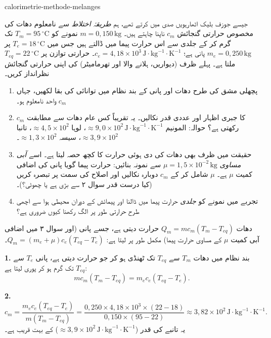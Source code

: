 \begin{exo}{calorimetrie-methode-melanges}

جیسے جوزف بلیک اٹھارہویں صدی میں کرتے تھے، ہم \emph{طریقۂ اختلاط} سے نامعلوم دھات کی مخصوص حرارتی گنجائش $c_m$ ناپنا چاہتے ہیں۔ $m=0{,}150\,\text{kg}$ نمونے کو $T_m=95\,{}^\circ\text{C}$ تک گرم کر کے جلدی سے اس حرارت پیما میں ڈالتے ہیں جس میں $T_e=18\,{}^\circ\text{C}$ پر $m_e=0{,}250\,\text{kg}$ پانی ہے؛ $c_e=4{,}18\times10^3\,\text{J}\!\cdot\!\text{kg}^{-1}\!\cdot\!\text{K}^{-1}$۔ حرارتی توازن پر $T_{eq}=22\,{}^\circ\text{C}$ ملتا ہے۔ پہلے ظرف (دیواریں، ہلانے والا اور تھرمامیٹر) کی اپنی حرارتی گنجائش نظرانداز کریں۔

\begin{enumerate}
  \item پچھلی مشق کی طرح دھات اور پانی کے بند نظام میں توانائی کی بقا لکھیں، جہاں $c_m$ واحد نامعلوم ہو۔
  \item $c_m$ کا جبری اظہار اور عددی قدر نکالیں۔ یہ تقریباً کس عام دھات سے مطابقت رکھتی ہے؟ حوالہ: المونیم $\approx9{,}0\times10^2\,\text{J}\!\cdot\!\text{kg}^{-1}\!\cdot\!\text{K}^{-1}$، لوہا $\approx4{,}5\times10^2$، تانبا $\approx3{,}9\times10^2$، سیسہ $\approx1{,}3\times10^2$۔
  \item حقیقت میں ظرف بھی دھات کی دی ہوئی حرارت کا کچھ حصہ لیتا ہے۔ اسے \emph{آبی مساوی} $\mu=1{,}5\times10^{-2}\,\text{kg}$ سے نمونہ بنائیں: حرارت پیما گویا پانی کی اضافی کمیت $\mu$ ہے۔ $\mu$ شامل کر کے $c_m$ دوبارہ نکالیں اور اصلاح کی سمت پر تبصرہ کریں (کیا درست قدر سوال ۲ سے بڑی ہے یا چھوٹی؟)۔
  \item تجربے میں نمونے کو \emph{جلدی} حرارت پیما میں ڈالنا اور پیمائش کے دوران محیطی ہوا سے اچھی طرح حرارتی طور پر الگ رکھنا کیوں ضروری ہے؟
\end{enumerate}

\begin{indication}
دھات $Q_m=mc_m(T_m-T_{eq})$ حرارت دیتی ہے، جسے پانی (اور سوال ۳ میں اضافی آبی کمیت $\mu$ کے مساوی حرارت پیما) مکمل طور پر لیتا ہے: $Q_m=(m_e+\mu)c_e(T_{eq}-T_e)$۔
\end{indication}

\begin{solution}
\textbf{1.} بند نظام میں دھات $T_m$ سے $T_{eq}$ تک ٹھنڈی ہو کر جو حرارت دیتی ہے، پانی $T_e$ سے $T_{eq}$ تک گرم ہو کر پوری لیتا ہے:
\[
mc_m(T_m-T_{eq})=m_ec_e(T_{eq}-T_e).
\]

\textbf{2.}
\[
c_m=\frac{m_ec_e(T_{eq}-T_e)}{m(T_m-T_{eq})}
=\frac{0{,}250\times4{,}18\times10^3\times(22-18)}{0{,}150\times(95-22)}
\approx3{,}82\times10^2\,\text{J}\!\cdot\!\text{kg}^{-1}\!\cdot\!\text{K}^{-1}.
\]
یہ تانبے کی قدر ($\approx3{,}9\times10^2\,\text{J}\!\cdot\!\text{kg}^{-1}\!\cdot\!\text{K}^{-1}$) کے بہت قریب ہے۔


\end{solution}
\end{exo}
